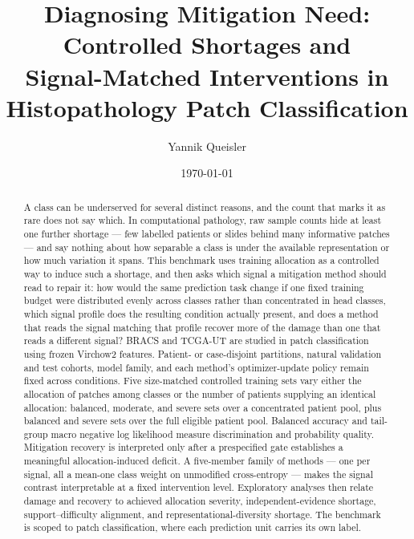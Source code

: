 \documentclass[11pt]{article}
\title{Diagnosing Mitigation Need: Controlled Shortages and\\
Signal-Matched Interventions in Histopathology Patch Classification}
\author{Yannik Queisler}
\date{\today}
\begin{document}
\raggedbottom
\hypersetup{pageanchor=false}
\begin{titlepage}
\centering
\vspace*{\fill}
\makeatletter
{\LARGE\bfseries \@title\par}
\vspace{1.5em}
{\large \@author\par}
\vspace{1.5em}
{\large \@date\par}
\makeatother

\begin{abstract}
\begingroup
\setlength{\emergencystretch}{2em}
\noindent A class can be underserved for several distinct reasons, and the count that marks it as rare does not say which. In computational pathology, raw sample counts hide at least one further shortage --- few labelled patients or slides behind many informative patches --- and say nothing about how separable a class is under the available representation or how much variation it spans. This benchmark uses training allocation as a controlled way to induce such a shortage, and then asks which signal a mitigation method should read to repair it: how would the same prediction task change if one fixed training budget were distributed evenly across classes rather than concentrated in head classes, which signal profile does the resulting condition actually present, and does a method that reads the signal matching that profile recover more of the damage than one that reads a different signal? BRACS and TCGA-UT are studied in patch classification using frozen Virchow2 features. Patient- or case-disjoint partitions, natural validation and test cohorts, model family, and each method's optimizer-update policy remain fixed across conditions. Five size-matched controlled training sets vary either the allocation of patches among classes or the number of patients supplying an identical allocation: balanced, moderate, and severe sets over a concentrated patient pool, plus balanced and severe sets over the full eligible patient pool. Balanced accuracy and tail-group macro negative log likelihood measure discrimination and probability quality. Mitigation recovery is interpreted only after a prespecified gate establishes a meaningful allocation-induced deficit. A five-member family of methods --- one per signal, all a mean-one class weight on unmodified cross-entropy --- makes the signal contrast interpretable at a fixed intervention level. Exploratory analyses then relate damage and recovery to achieved allocation severity, independent-evidence shortage, support--difficulty alignment, and representational-diversity shortage. The benchmark is scoped to patch classification, where each prediction unit carries its own label.
\par
\endgroup
\end{abstract}
\vspace*{\fill}
\end{titlepage}
\hypersetup{pageanchor=true}
\end{document}
